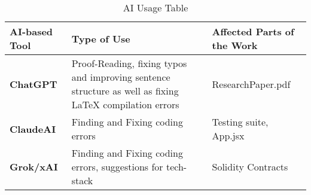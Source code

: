 \documentclass[11pt,a4paper]{article}
\begin{document}
        \begin{table}[htbp]
            \centering
            \caption{AI Usage Table}

            \label{tab:AI-usage}
            \begin{tabular}{|p{}|p{}|p{}|}
                \hline
                \textbf{AI-based Tool} & \textbf{Type of Use} & \textbf{Affected Parts of the Work} \\
                \hline
                \textbf{ChatGPT} & Proof-Reading, fixing typos and improving sentence structure as well as fixing LaTeX compilation errors & ResearchPaper.pdf \\
                \hline
                \textbf{ClaudeAI} & Finding and Fixing coding errors & Testing suite, App.jsx \\
                \hline
                \textbf{Grok/xAI} & Finding and Fixing coding errors, suggestions for tech-stack & Solidity Contracts \\
                \hline
            \end{tabular}
        \end{table}


	
\end{document}
